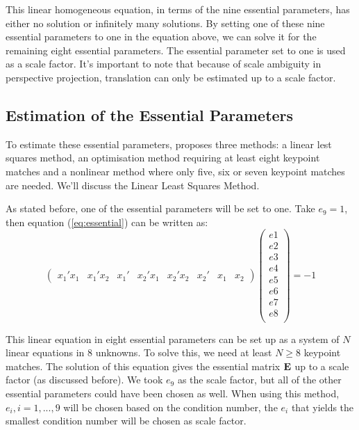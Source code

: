 This linear homogeneous equation, in terms of the nine essential parameters, has either no solution or infinitely many solutions. By setting one of these nine essential parameters to one in the equation above, we can solve it for the remaining eight essential parameters. The essential parameter set to one is used as a scale factor. It's important to note that because of scale ambiguity in perspective projection, translation can only be estimated up to a scale factor.

\subsection{Estimation of the Essential Parameters}
To estimate these essential parameters, \cite{tekalp} proposes three methods: a linear lest squares method, an optimisation method requiring at least eight keypoint matches and a nonlinear method where only five, six or seven keypoint matches are needed. We'll discuss the Linear Least Squares Method.\bigskip

As stated before, one of the essential parameters will be set to one. Take $e_9 = 1$, then equation (\ref{eq:essential}) can be written as:
\begin{equation}
    \begin{pmatrix}
        x_1'x_1 &
        x_1'x_2 &
        x_1' &
        x_2'x_1 &
        x_2'x_2 &
        x_2' &
        x_1 &
        x_2
    \end{pmatrix}
    \begin{pmatrix}
        e1 \\
        e2 \\
        e3 \\
        e4 \\
        e5 \\
        e6 \\
        e7 \\
        e8 \\
    \end{pmatrix}
    = -1
\end{equation}

This linear equation in eight essential parameters can be set up as a system of $N$ linear equations in 8 unknowns. To solve this, we need at least $N \geq 8$ keypoint matches. The solution of this equation gives the essential matrix $\mathbf{E}$ up to a scale factor (as discussed before). We took $e_9$ as the scale factor, but all of the other essential parameters could have been chosen as well. When using this method, $e_i, i = 1,...,9$ will be chosen based on the condition number, the $e_i$ that yields the smallest condition number will be chosen as scale factor.

